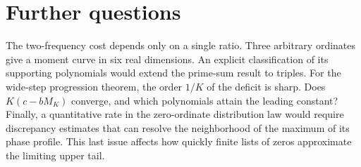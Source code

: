 \documentclass[11pt,letterpaper]{article}
\theoremstyle{remark}\newtheorem{remark}[theorem]{Remark}
\begin{document}
\section{Further questions}
The two-frequency cost depends only on a single ratio. Three arbitrary
ordinates give a moment curve in six real dimensions. An explicit classification
of its supporting polynomials would extend the prime-sum result to triples.
For the wide-step progression theorem, the order $1/K$ of the deficit is
sharp. Does $K(c-bM_K)$ converge, and which polynomials attain the leading
constant? Finally, a quantitative rate in the zero-ordinate distribution
law would require discrepancy estimates that can resolve the neighborhood of
the maximum of its phase profile. This last issue affects how quickly finite
lists of zeros approximate the limiting upper tail.
\end{document}
